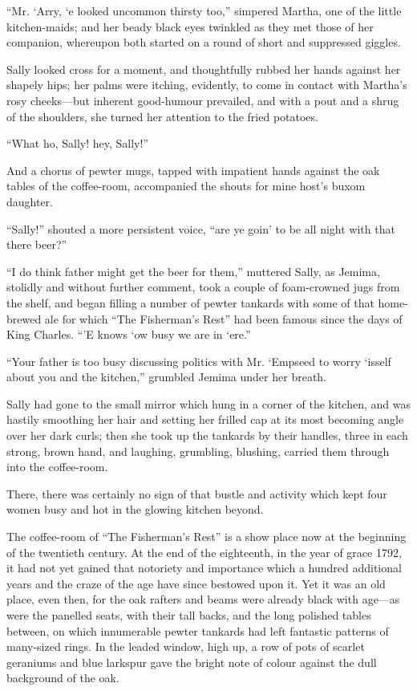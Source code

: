 \documentclass[paper=a5,BCOR=7mm,twoside,DIV=calc,12pt,usegeometry,chapterprefix,endperiod,headings=big]{scrbook}
\begin{document}
\enquote{Mr. `Arry, `e looked uncommon thirsty too,} simpered Martha, one of the little kitchen-maids; and her beady black eyes twinkled as they met those of her companion, whereupon both started on a round of short and suppressed giggles.

Sally looked cross for a moment, and thoughtfully rubbed her hands against her shapely hips; her palms were itching, evidently, to come in contact with Martha's rosy cheeks---but inherent good-humour prevailed, and with a pout and a shrug of the shoulders, she turned her attention to the fried potatoes.

\enquote{What ho, Sally! hey, Sally!}

And a chorus of pewter mugs, tapped with impatient hands against the oak tables of the coffee-room, accompanied the shouts for mine host's buxom daughter.

\enquote{Sally!} shouted a more persistent voice, \enquote{are ye goin’ to be all night with that there beer?}

\enquote{I do think father might get the beer for them,} muttered Sally, as Jemima, stolidly and without further comment, took a couple of foam-crowned jugs from the shelf, and began filling a number of pewter tankards with some of that home-brewed ale for which \enquote{The Fisherman's Rest} had been famous since the days of King Charles. \enquote{’E knows `ow busy we are in `ere.}

\enquote{Your father is too busy discussing politics with Mr. `Empseed to worry `isself about you and the kitchen,} grumbled Jemima under her breath.

Sally had gone to the small mirror which hung in a corner of the kitchen, and was hastily smoothing her hair and setting her frilled cap at its most becoming angle over her dark curls; then she took up the tankards by their handles, three in each strong, brown hand, and laughing, grumbling, blushing, carried them through into the coffee-room.

There, there was certainly no sign of that bustle and activity which kept four women busy and hot in the glowing kitchen beyond.

The coffee-room of \enquote{The Fisherman's Rest} is a show place now at the beginning of the twentieth century. At the end of the eighteenth, in the year of grace 1792, it had not yet gained that notoriety and importance which a hundred additional years and the craze of the age have since bestowed upon it. Yet it was an old place, even then, for the oak rafters and beams were already black with age---as were the panelled seats, with their tall backs, and the long polished tables between, on which innumerable pewter tankards had left fantastic patterns of many-sized rings. In the leaded window, high up, a row of pots of scarlet geraniums and blue larkspur gave the bright note of colour against the dull background of the oak.
\end{document}
